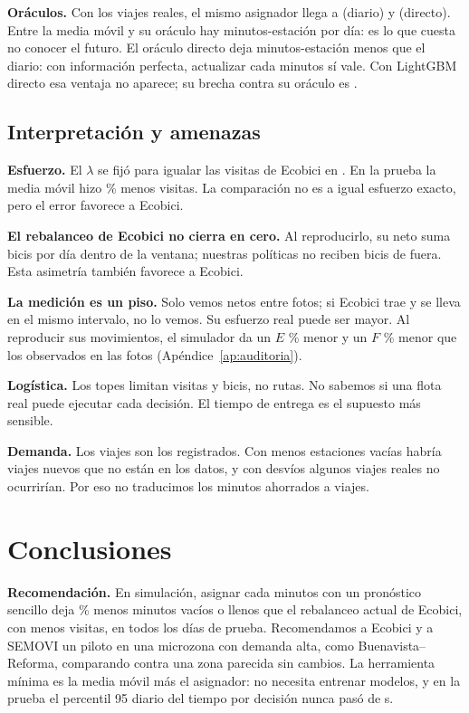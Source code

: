 \documentclass[conference,letterpaper,10pt]{IEEEtran}
\begin{document}
\textbf{Oráculos.} Con los viajes reales, el mismo asignador llega a \rorDEF{} (diario) y \rorDirEF{} (directo). Entre la media móvil y su oráculo hay \rmaGap{} minutos-estación por día: es lo que cuesta no conocer el futuro. El oráculo directo deja \roracleDirectGap{} minutos-estación menos que el diario: con información perfecta, actualizar cada \rstepMin{} minutos sí vale. Con LightGBM directo esa ventaja no aparece; su brecha contra su oráculo es \rlgbmDirGap.

\subsection{Interpretación y amenazas}
\textbf{Esfuerzo.} El $\lambda$ se fijó para igualar las visitas de Ecobici en \rselMes. En la prueba la media móvil hizo \rmaVisPct\% menos visitas. La comparación no es a igual esfuerzo exacto, pero el error favorece a Ecobici.

\textbf{El rebalanceo de Ecobici no cierra en cero.} Al reproducirlo, su neto suma \recoNeto{} bicis por día dentro de la ventana; nuestras políticas no reciben bicis de fuera. Esta asimetría también favorece a Ecobici.

\textbf{La medición es un piso.} Solo vemos netos entre fotos; si Ecobici trae y se lleva en el mismo intervalo, no lo vemos. Su esfuerzo real puede ser mayor. Al reproducir sus movimientos, el simulador da un $E$ \rvRel\% menor y un $F$ \rvRelF\% menor que los observados en las fotos (Apéndice~\ref{ap:auditoria}).

\textbf{Logística.} Los topes limitan visitas y bicis, no rutas. No sabemos si una flota real puede ejecutar cada decisión. El tiempo de entrega es el supuesto más sensible.

\textbf{Demanda.} Los viajes son los registrados. Con menos estaciones vacías habría viajes nuevos que no están en los datos, y con desvíos algunos viajes reales no ocurrirían. Por eso no traducimos los minutos ahorrados a viajes.

\section{Conclusiones}
\textbf{Recomendación.} En simulación, asignar cada \rstepMin{} minutos con un pronóstico sencillo deja \rmaPct\% menos minutos vacíos o llenos que el rebalanceo actual de Ecobici, con menos visitas, en todos los días de prueba. Recomendamos a Ecobici y a SEMOVI un piloto en una microzona con demanda alta, como Buenavista--Reforma, comparando contra una zona parecida sin cambios. La herramienta mínima es la media móvil más el asignador: no necesita entrenar modelos, y en la prueba el percentil 95 diario del tiempo por decisión nunca pasó de \rdecPNoventaCinco{} s.
\end{document}
